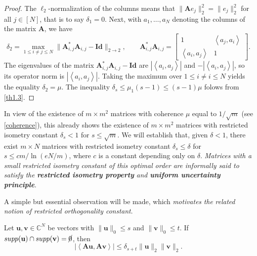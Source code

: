 \begin{proof}
    The $\ell_2$-normalization of the columns means that $\|\mathbf{A}e_j\|_2^2 = \|e_j\|_2^2$ for all $j \in [N]$, that is to say $\delta_1 = 0$. Next, with $a_1,\dots,a_N$ denoting the columns of the matrix $\mathbf{A}$, we have
    \begin{equation*}
        \delta_2 = \max\limits_{1 \leq i \neq j \leq N} \|\mathbf{A}_{i,j}^*\mathbf{A}_{i,j} - \mathbf{Id}\|_{2 \rightarrow 2}, \qquad \mathbf{A}_{i,j}^*\mathbf{A}_{i,j} = 
        \left[
            \begin{array}{cc}
                1 & \left<a_j,a_i\right> \\
                \left<a_i,a_j\right> &1
            \end{array}
        \right].
    \end{equation*}
    The eigenvalues of the matrix $\mathbf{A}_{i,j}^*\mathbf{A}_{i,j} - \mathbf{Id}$ are $\left|\left<a_i,a_j\right>\right|$ and $-\left|\left<a_i,a_j\right>\right|$, so its operator norm is $\left|\left<a_i,a_j\right>\right|$. Taking the maximum over $1 \leq i \neq i \leq N$ yields the equality $\delta_2 = \mu$. The inequality $\delta_s \leq \mu_1(s-1) \leq (s-1)\mu$ folows from \cref{th1.3}.
\end{proof}

In view of the existence of $m \times m^2$ matrices with coherence $\mu$ equal to $1/\sqrt{m}$ (see \cref{coherence}), this already shows the existence of $m \times m^2$ matrices with restricted isometry constant $\delta_s < 1$ for $s \leq \sqrt{m}$. We will establish that, given $\delta < 1$, there exist $m \times N$ matrices with restricted isometry constant $\delta_s \leq \delta$ for $s \leq cm/\ln(eN/m)$, where $c$ is a constant depending only on $\delta$. \emph{\textcolor[rgb]{1,0,0}{Matrices with a small restricted isometry constant of this optimal order are informally said to satisfy the \textbf{restricted isometry property} and \textbf{uniform uncertainty principle}}}.

A simple but essential observation will be made, which \emph{\textcolor[rgb]{1,0,0}{motivates the related notion of restricted orthogonality constant}}.
\begin{proposition}
    \label{pr2.3}
    Let $\mathbf{u},\mathbf{v} \in \mathbb{C}^N$ be vectors with $\|\mathbf{u}\|_0 \leq s$ and $\|\mathbf{v}\|_0 \leq t$. If $supp(\mathbf{u}) \cap supp(\mathbf{v}) = \cancel{0}$, then
    \begin{equation}
        \label{eq2.3}
        \left|\left<\mathbf{Au}, \mathbf{Av}\right>\right| \leq \delta_{s+t} \|\mathbf{u}\|_2\|\mathbf{v}\|_2.
    \end{equation}
\end{proposition}

